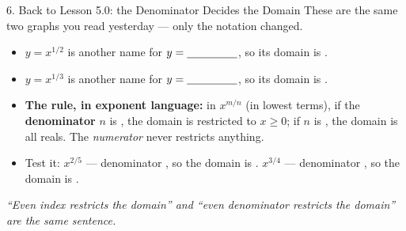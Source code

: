 \documentclass[10pt]{article}
\newcommand{\lgrid}[4]{%
  \draw[step=1, linegray!40, very thin] (#1,#3) grid (#2,#4);
  \draw[->, semithick, charcoal] (#1,0)--(#2,0) node[below right, font=\scriptsize]{$x$};
  \draw[->, semithick, charcoal] (0,#3)--(0,#4) node[left, font=\scriptsize]{$y$};}
\newcommand{\cbrtpos}[2]{\draw[very thick, forest, domain=#1:#2, samples=70, smooth]
  plot (\x,{pow(\x,1/3)});}
\newcommand{\cbrtneg}[2]{\draw[very thick, forest, domain=#1:#2, samples=70, smooth]
  plot (\x,{-pow(-1*(\x),1/3)});}
\begin{document}
\begin{notesbox}{6. Back to Lesson 5.0: the Denominator Decides the Domain}
These are the same two graphs you read yesterday --- only the notation changed.
\begin{center}
\end{center}
\begin{itemize}[leftmargin=1.5em, itemsep=3pt]
  \item $y=x^{1/2}$ is another name for $y=\blank{1.6cm}$, so its domain is \blank{2.4cm}.
  \item $y=x^{1/3}$ is another name for $y=\blank{1.6cm}$, so its domain is \blank{2.6cm}.
  \item \textbf{The rule, in exponent language:} in $x^{m/n}$ (in lowest terms), if the
        \textbf{denominator} $n$ is \blank{1.6cm}, the domain is restricted to $x\ge 0$;
        if $n$ is \blank{1.6cm}, the domain is all reals. The \emph{numerator} never restricts
        anything.
  \item Test it: $x^{2/5}$ --- denominator \blank{0.8cm}, so the domain is \blank{2.4cm}. \quad
        $x^{3/4}$ --- denominator \blank{0.8cm}, so the domain is \blank{2.4cm}.
\end{itemize}
\emph{``Even index restricts the domain'' and ``even denominator restricts the domain'' are the same
sentence.}
\end{notesbox}
\end{document}
